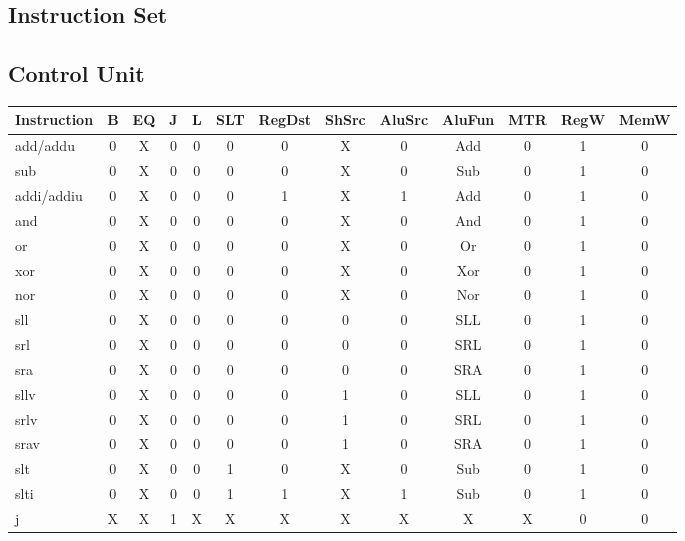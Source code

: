 \subsection{Instruction Set}

\subsection{Control Unit}

\begin{table}[ht]
    \begin{tabular}{|l|c|c|c|c|c|c|c|c|c|c|c|c|}
        \hline
        Instruction & B & EQ & J & L & SLT & RegDst & ShSrc & AluSrc & AluFun & MTR & RegW & MemW \\
        \hline
        add/addu   & 0 & X & 0 & 0 & 0 & 0 & X & 0 & Add & 0 & 1 & 0 \\
        sub        & 0 & X & 0 & 0 & 0 & 0 & X & 0 & Sub & 0 & 1 & 0 \\
        addi/addiu & 0 & X & 0 & 0 & 0 & 1 & X & 1 & Add & 0 & 1 & 0 \\
        \hline
        and        & 0 & X & 0 & 0 & 0 & 0 & X & 0 & And & 0 & 1 & 0 \\
        or         & 0 & X & 0 & 0 & 0 & 0 & X & 0 & Or  & 0 & 1 & 0 \\
        xor        & 0 & X & 0 & 0 & 0 & 0 & X & 0 & Xor & 0 & 1 & 0 \\
        nor        & 0 & X & 0 & 0 & 0 & 0 & X & 0 & Nor & 0 & 1 & 0 \\
        \hline
        sll        & 0 & X & 0 & 0 & 0 & 0 & 0 & 0 & SLL & 0 & 1 & 0 \\
        srl        & 0 & X & 0 & 0 & 0 & 0 & 0 & 0 & SRL & 0 & 1 & 0 \\
        sra        & 0 & X & 0 & 0 & 0 & 0 & 0 & 0 & SRA & 0 & 1 & 0 \\
        sllv       & 0 & X & 0 & 0 & 0 & 0 & 1 & 0 & SLL & 0 & 1 & 0 \\
        srlv       & 0 & X & 0 & 0 & 0 & 0 & 1 & 0 & SRL & 0 & 1 & 0 \\
        srav       & 0 & X & 0 & 0 & 0 & 0 & 1 & 0 & SRA & 0 & 1 & 0 \\
        \hline
        slt        & 0 & X & 0 & 0 & 1 & 0 & X & 0 & Sub & 0 & 1 & 0 \\
        slti       & 0 & X & 0 & 0 & 1 & 1 & X & 1 & Sub & 0 & 1 & 0 \\
        \hline
        j          & X & X & 1 & X & X & X & X & X & X   & X & 0 & 0 \\

\end{tabular}
\end{table}

